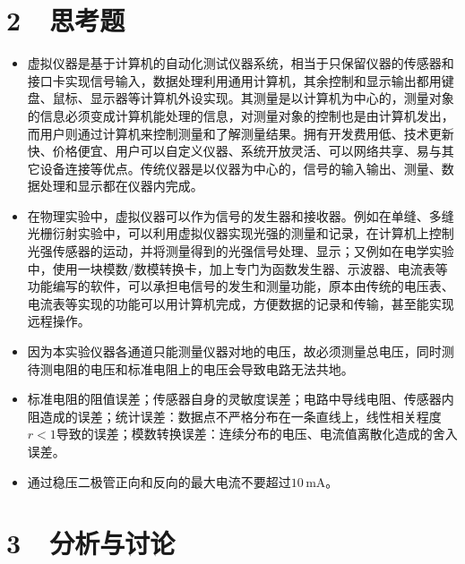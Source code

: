 \documentclass[a4paper,fontset=windows]{ctexart}
\begin{document}
    \newpage
    \section*{2\ \ 思考题}

    \begin{itemize}
        \item[1.] 虚拟仪器是基于计算机的自动化测试仪器系统，相当于只保留仪器的传感器和接口卡实现信号输入，数据处理利用通用计算机，其余控制和显示输出都用键盘、鼠标、显示器等计算机外设实现。其测量是以计算机为中心的，测量对象的信息必须变成计算机能处理的信息，对测量对象的控制也是由计算机发出，而用户则通过计算机来控制测量和了解测量结果。拥有开发费用低、技术更新快、价格便宜、用户可以自定义仪器、系统开放灵活、可以网络共享、易与其它设备连接等优点。传统仪器是以仪器为中心的，信号的输入输出、测量、数据处理和显示都在仪器内完成。

        \item[2.] 在物理实验中，虚拟仪器可以作为信号的发生器和接收器。例如在单缝、多缝光栅衍射实验中，可以利用虚拟仪器实现光强的测量和记录，在计算机上控制光强传感器的运动，并将测量得到的光强信号处理、显示；又例如在电学实验中，使用一块模数/数模转换卡，加上专门为函数发生器、示波器、电流表等功能编写的软件，可以承担电信号的发生和测量功能，原本由传统的电压表、电流表等实现的功能可以用计算机完成，方便数据的记录和传输，甚至能实现远程操作。

        \item[3.] 因为本实验仪器各通道只能测量仪器对地的电压，故必须测量总电压，同时测待测电阻的电压和标准电阻上的电压会导致电路无法共地。

        \item[4.] 标准电阻的阻值误差；传感器自身的灵敏度误差；电路中导线电阻、传感器内阻造成的误差；统计误差：数据点不严格分布在一条直线上，线性相关程度$r<1$导致的误差；模数转换误差：连续分布的电压、电流值离散化造成的舍入误差。

        \item[5.] 通过稳压二极管正向和反向的最大电流不要超过$10\,\mathrm{mA}$。
    \end{itemize}

    \section*{3\ \ 分析与讨论}
\end{document}
